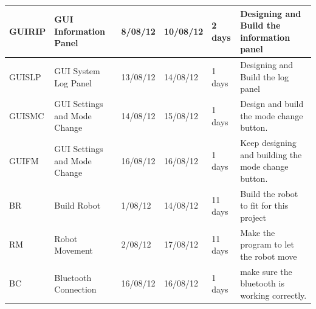 \documentclass[11pt, a4paper]{report}
\begin{document}
\begin{tabular}{|p{2cm}|p{3cm}|p{2cm}|p{2cm}|p{2cm}|p{5cm}|}
GUIRIP	&	GUI Information Panel 	&  8/08/12	&	10/08/12	& 2 days	&	Designing and Build the information panel \\  \hline
GUISLP	&	 GUI System Log Panel	&  13/08/12	&	14/08/12	& 1 days	&Designing and Build the log panel	 \\  \hline
GUISMC	&	 GUI Settings and Mode Change	&  14/08/12	&	15/08/12	& 1 days	& Design and build the mode change button. \\  \hline
GUIFM	&	GUI Settings and Mode Change	&  16/08/12	&	16/08/12	& 1 days	&Keep designing and building the mode change button. \\  \hline
BR		&	Build Robot	&  1/08/12	&	14/08/12	& 11 days	&	Build the robot to fit for this project \\  \hline
RM	&	Robot Movement	&  2/08/12	&	17/08/12	& 11 days	&	Make the program to let the robot move\\  \hline
BC		&	Bluetooth Connection	&  16/08/12	&	16/08/12	& 1 days	& 	 make sure the bluetooth is working correctly.\\  \hline

\end{tabular}
\end{document}
